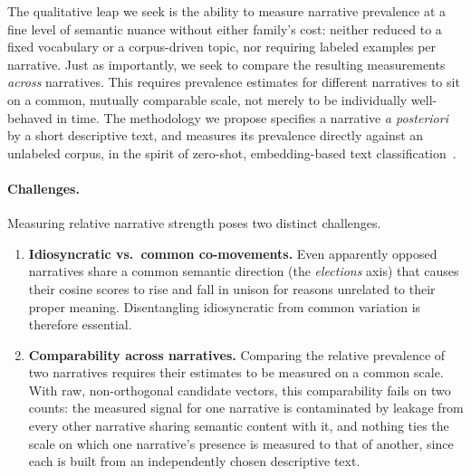 \documentclass[
  journal=medium,
  manuscript=article-type,
  year=2025,
  volume=1,
]{cup-journal}
\begin{document}
The qualitative leap we seek is the ability to measure narrative prevalence at a
fine level of semantic nuance without either family's cost: neither reduced to a
fixed vocabulary or a corpus-driven topic, nor requiring labeled examples per
narrative. Just as importantly, we seek to compare the resulting measurements
\emph{across} narratives. This
requires prevalence estimates for different narratives to sit on a common,
mutually comparable scale, not merely to be individually well-behaved in time.
The methodology we propose specifies a narrative \emph{a posteriori} by a short
descriptive text, and measures its prevalence directly against an unlabeled
corpus, in the spirit of zero-shot, embedding-based text
classification~\autocite{schopf2023evaluating}.

\paragraph{Challenges.}
Measuring relative narrative strength poses two distinct challenges.
\begin{enumerate}
    \item \textbf{Idiosyncratic vs.\ common co-movements.}
    Even apparently opposed narratives share
    a common semantic direction (the \textit{elections} axis) that causes
    their cosine scores to rise and fall in unison for reasons unrelated to their proper meaning.
    Disentangling idiosyncratic from common variation is therefore essential.
    \item \textbf{Comparability across narratives.}
    Comparing the relative prevalence of two narratives requires their estimates
    to be measured on a common scale. With raw, non-orthogonal candidate vectors,
    this comparability fails on two counts: the measured signal for one narrative
    is contaminated by leakage from every other narrative sharing semantic content
    with it, and nothing ties the scale on which one narrative's presence is
    measured to that of another, since each is built from an independently chosen
    descriptive text. %
\end{enumerate}
\end{document}
